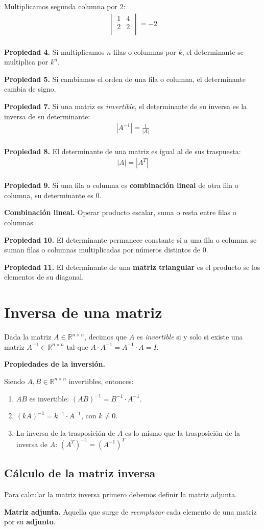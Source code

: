 \documentclass[12pt]{article}
\begin{document}
Multiplicamos segunda columna por 2:
\begin{align*}
  \begin{vmatrix}
    1 & 4\\
    2 & 2\\
  \end{vmatrix} = -2\\
\end{align*}

\textbf{Propiedad 4.}
Si multiplicamos \(n\) filas o columnas por \(k\), 
el determinante se multiplica por \(k^{n}\).

\textbf{Propiedad 5.}
Si cambiamos el orden de una fila o columna,
el determinante cambia de signo.

\textbf{Propiedad 7.}
Si una matriz es \textit{invertible},
el determinante de su inversa es la inversa de su determinante:
\begin{align*}
  |A^{-1}| = \frac{1}{|A|}\\
\end{align*}

\textbf{Propiedad 8.}
El determinante de una matriz es igual al de sus traspuesta:
\begin{align*}
  |A| = |A^{T}| \\
\end{align*}

\textbf{Propiedad 9.}
Si una fila o columna es \textbf{combinación lineal} de otra fila o columna,
su determinante es 0.

\textbf{Combinación lineal.} 
Operar producto escalar, suma o resta entre filas o columnas.

\textbf{Propiedad 10.}
El determinante permanece constante si a una fila o columna
se suman filas o columnas multiplicadas por números distintos de 0.

\textbf{Propiedad 11.}
El determinante de una \textbf{matriz triangular} es el producto
se los elementos de su diagonal.

\section{Inversa de una matriz}

Dada la matriz \(A \in \mathbb{R}^{n \times n}\),
decimos que \(A\) es \textit{invertible} si y solo si
existe una matriz \(A^{-1} \in \mathbb{R}^{n \times n}\)
tal que \(A \cdot A^{-1} = A^{-1} \cdot A = I\).

\textbf{Propiedades de la inversión.}

Siendo \(A, B \in \mathbb{R}^{n \times n}\) invertibles, entonces:
\begin{enumerate}
  \item \(AB\) es invertible: \((AB)^{-1} = B^{-1} \cdot A^{-1}\).
  \item \((kA)^{-1} = k^{-1} \cdot A^{-1}\), con \(k \neq 0\).
  \item La inversa de la trasposición de \(A\)
        es lo mismo que la trasposición de la inversa de \(A\):
        \((A^{T})^{-1} = (A^{-1})^{T}\)
\end{enumerate}

\subsection{Cálculo de la matriz inversa}

Para calcular la matriz inversa primero debemos definir la matriz adjunta.

\textbf{Matriz adjunta.}
Aquella que surge de \textit{reemplazar} cada elemento de una matriz por 
su \textbf{adjunto}.
\end{document}
